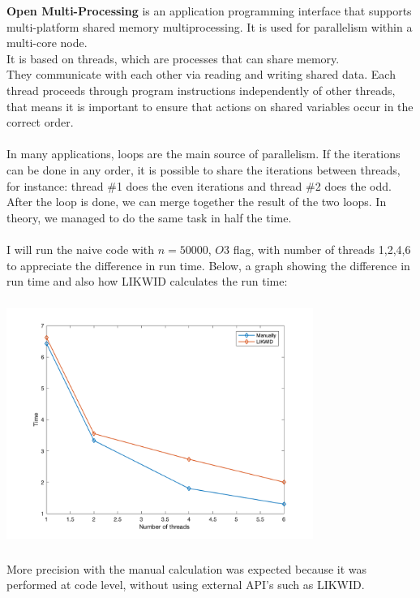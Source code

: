 \documentclass[11pt,a4paper,oneside,titlepage,openright]{book}
\begin{document}
\textbf{Open Multi-Processing} is an application programming interface that supports multi-platform shared memory multiprocessing. It is used for parallelism within a multi-core node.\\ It is based on threads, which are processes that can share memory. \\They communicate with each other via reading and writing shared data. 
Each thread proceeds through program instructions independently of other threads, that means it is important to ensure that actions on shared variables occur in the correct order.\\\\
In many applications, loops are the main source of parallelism. If the iterations can be done in any order, it is possible to share the iterations between threads, for instance: thread \#1 does the even iterations and thread \#2 does the odd. After the loop is done, we can merge together the result of the two loops. In theory, we managed to do the same task in half the time.\\\\
I will run the naive code with $n = 50000$, $O3$ flag, with number of threads 1,2,4,6 to appreciate the difference in run time. Below, a graph showing the difference in run time and also how LIKWID calculates the run time:
\begin{center}
\includegraphics[width=10cm, height=8cm]{graficotimes}
\end{center}

More precision with the manual calculation was expected because it was performed at code level, without using external API's such as LIKWID.
\end{document}
